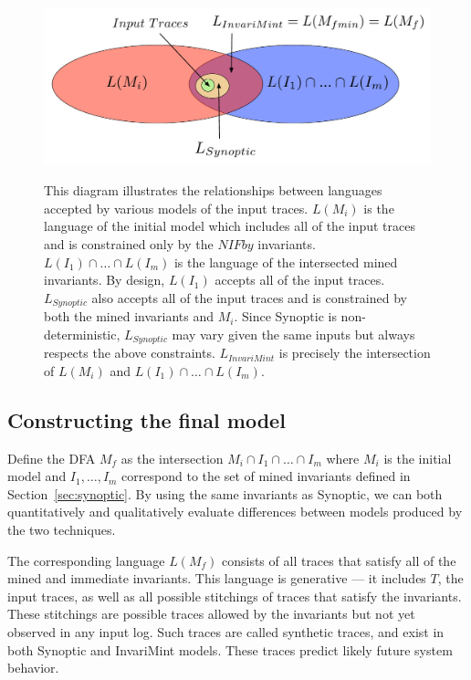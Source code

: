 \begin{figure}[t!]
   \center
   {\includegraphics[width=0.95\columnwidth]{fig/language-venn.pdf}}
   \caption{This diagram illustrates the relationships between languages
    accepted by various models of the input traces. $L(M_i)$ is the language of
    the initial model which includes all of the input traces and is constrained
    only by the $NIFby$ invariants.
    $L(I_1) \cap \ldots \cap L(I_m)$ is the language of the intersected mined
    invariants. By design, $L(I_1)$ accepts all of the input traces.
    $L_{Synoptic}$ also accepts all of the input traces and is constrained by
    both the mined invariants and $M_i$. 
    Since Synoptic is non-deterministic, $L_{Synoptic}$ may vary given the same
    inputs but always respects the above constraints.
    $L_{InvariMint}$ is precisely the intersection of $L(M_i)$ and $L(I_1) \cap
    \ldots \cap L(I_m)$.
   } 
   \label{fig:language-venn}
\end{figure}


\subsection{Constructing the final model}
Define the DFA $M_f$ as the intersection $M_i \cap I_1 \cap \ldots
\cap I_m$ where $M_i$ is the initial model and $I_1, \ldots, I_m$
correspond to the set of mined
invariants defined in Section~\ref{sec:synoptic}.
By using the same invariants as Synoptic, we can both quantitatively and qualitatively
evaluate differences between models produced by the two techniques.

The corresponding language
$L(M_f)$ consists of all traces that
satisfy all of the mined and immediate invariants.  This language is generative
--- it includes $T$, the input traces, as well as all possible
stitchings of traces that satisfy the invariants. These stitchings are
possible traces allowed by the invariants but not yet observed in any input log.
Such traces are called synthetic traces, and exist in both Synoptic and
InvariMint models. These traces predict likely
future system behavior.

